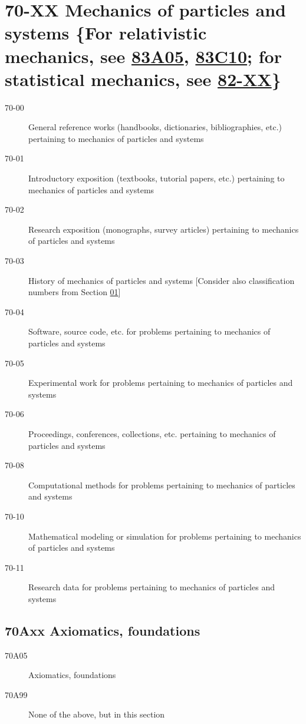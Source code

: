 \section*{70-XX Mechanics of particles and systems \{For relativistic mechanics, see \hyperref[83A05]{83A05}, \hyperref[83C10]{83C10}; for statistical mechanics, see \hyperref[82-XX]{82-XX}\} }\label{70-XX}
\begin{description}
\item [70-00]\label{70-00} General reference works (handbooks, dictionaries, bibliographies, etc.) pertaining to mechanics of particles and systems
\item [70-01]\label{70-01} Introductory exposition (textbooks, tutorial papers, etc.) pertaining to mechanics of particles and systems
\item [70-02]\label{70-02} Research exposition (monographs, survey articles) pertaining to mechanics of particles and systems
\item [70-03]\label{70-03} History of mechanics of particles and systems [Consider also classification numbers from Section \hyperref[01-XX]{01}]
\item [70-04]\label{70-04} Software, source code, etc. for problems pertaining to mechanics of particles and systems
\item [70-05]\label{70-05} Experimental work for problems pertaining to mechanics of particles and systems
\item [70-06]\label{70-06} Proceedings, conferences, collections, etc. pertaining to mechanics of particles and systems
\item [70-08]\label{70-08} Computational methods for problems pertaining to mechanics of particles and systems
\item [70-10]\label{70-10} Mathematical modeling or simulation for problems pertaining to mechanics of particles and systems
\item [70-11]\label{70-11} Research data for problems pertaining to mechanics of particles and systems
\end{description}
\subsection*{70Axx  Axiomatics, foundations }\label{70Axx}
\begin{description}  
\item [70A05]\label{70A05} Axiomatics, foundations
\item [70A99]\label{70A99} None of the above, but in this section
\end{description}
